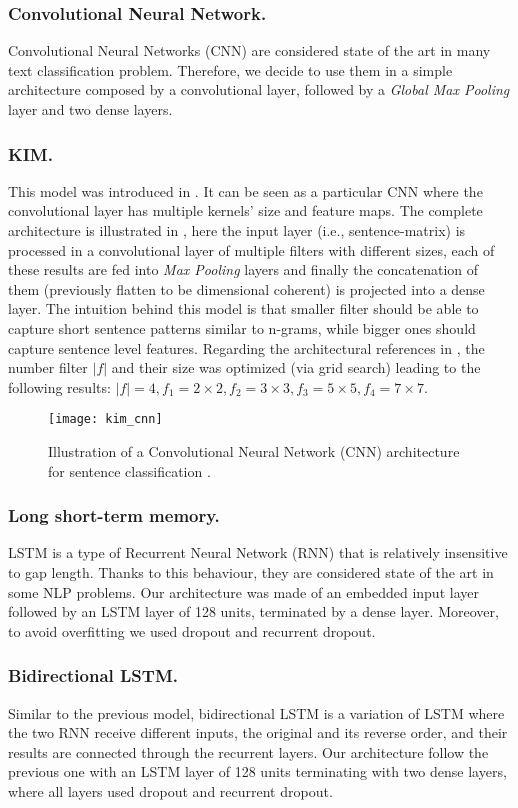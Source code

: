 \subsubsection{Convolutional Neural Network.}
Convolutional Neural Networks (CNN) are considered state of the art in many text classification problem. Therefore, we decide to use them in a simple architecture composed by a convolutional layer, followed by a \emph{Global Max Pooling} layer and two dense layers.

\subsubsection{KIM.}
This model was introduced in \cite{kim2014convolutional}. It can be seen as a particular CNN where the convolutional layer has multiple kernels' size and feature maps.
The complete architecture is illustrated in , here the input layer (i.e., sentence-matrix) is processed in a convolutional layer of multiple filters with different sizes, each of these results are fed into \emph{Max Pooling} layers and finally the concatenation of them (previously flatten to be dimensional coherent) is projected into a dense layer.
The intuition behind this model is that smaller filter should be able to capture short sentence patterns similar to n-grams, while bigger ones should capture sentence level features.
Regarding the architectural references in \cite{kim2014convolutional}, the number filter $|f|$ and their size was optimized (via grid search) leading to the following results: $|f| = 4, f_1 = 2\times2, f_2 = 3\times3, f_3 = 5\times5, f_4 = 7\times7$.

\begin{figure}[h]
\footnotesize
\centering
\texttt{[image: kim\_cnn]}
\caption{Illustration of a Convolutional Neural Network (CNN) architecture for sentence classification \cite{zhang2015sensitivity}.}
\label{fig:kim}
\end{figure}

\subsubsection{Long short-term memory.}
LSTM is a type of Recurrent Neural Network (RNN) that is relatively insensitive to gap length. Thanks to this behaviour, they are considered state of the art in some NLP problems.
Our architecture was made of an embedded input layer followed by an LSTM layer of 128 units, terminated by a dense layer. Moreover, to avoid overfitting we used dropout and recurrent dropout.

\subsubsection{Bidirectional LSTM.} Similar to the previous model, bidirectional LSTM is a variation of LSTM where the two RNN receive different inputs, the original and its reverse order, and their results are connected through the recurrent layers.
Our architecture follow the previous one with an LSTM layer of 128 units terminating with two dense layers, where all layers used dropout and recurrent dropout.

